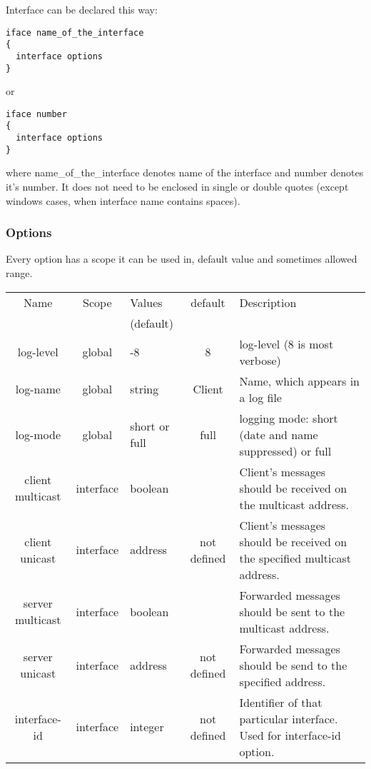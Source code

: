 Interface can be declared this way:
\begin{verbatim}
iface name_of_the_interface
{
  interface options
}
\end{verbatim}

or 

\begin{verbatim}
iface number 
{
  interface options
}
\end{verbatim}

where name\_of\_the\_interface denotes name of the interface and
number denotes it's number. It does not need to be enclosed in
single or double quotes (except windows cases, when interface name
contains spaces).

\subsubsection{Options}

Every option has a scope it can be used in, default value and
sometimes allowed range.

\begin{tabular}{|c|c|>{\centering}p{1.7cm}<{}|c|p{6cm}|}
\hline
Name             & Scope   & Values      & default    & Description \\
                 &         & (default)   &  & \\
\hline
log-level        & global  & 1-8         & 8          & log-level (8 is most verbose) \\
log-name         & global  & string      & Client     & Name, which appears in a log file\\
log-mode         & global  &short or full& full       & logging mode: short (date and name suppressed) or full \\

client multicast &interface& boolean     &            & Client's messages should be received on the multicast address.\\
client unicast   &interface& address     &not defined & Client's messages should be received on the specified multicast address. \\
server multicast &interface& boolean     &            & Forwarded messages should be sent to the multicast address. \\
server unicast   &interface& address     &not defined & Forwarded messages should be send to the specified address. \\
interface-id     &interface& integer     &not defined & Identifier of that particular interface. Used for interface-id option. \\
\hline
\end{tabular}

